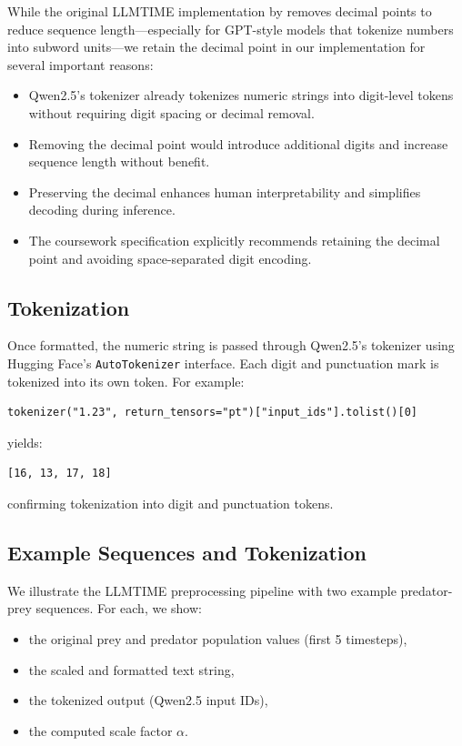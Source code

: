 \documentclass[a4paper,12pt]{article}
\begin{document}
While the original LLMTIME implementation by \citet{gruver2023language} removes decimal points to reduce sequence length—especially for GPT-style models that tokenize numbers into subword units—we retain the decimal point in our implementation for several important reasons:

\begin{itemize}
  \item Qwen2.5's tokenizer already tokenizes numeric strings into digit-level tokens without requiring digit spacing or decimal removal.
  \item Removing the decimal point would introduce additional digits and increase sequence length without benefit.
  \item Preserving the decimal enhances human interpretability and simplifies decoding during inference.
  \item The coursework specification explicitly recommends retaining the decimal point and avoiding space-separated digit encoding.
\end{itemize}

\subsection*{Tokenization}

Once formatted, the numeric string is passed through Qwen2.5’s tokenizer using Hugging Face’s \texttt{AutoTokenizer} interface. Each digit and punctuation mark is tokenized into its own token. For example:
\begin{verbatim}
tokenizer("1.23", return_tensors="pt")["input_ids"].tolist()[0]
\end{verbatim}
yields:
\begin{verbatim}
[16, 13, 17, 18]
\end{verbatim}
confirming tokenization into digit and punctuation tokens.

\subsection*{Example Sequences and Tokenization}

We illustrate the LLMTIME preprocessing pipeline with two example predator-prey sequences. For each, we show:

\begin{itemize}
  \item the original prey and predator population values (first 5 timesteps),
  \item the scaled and formatted text string,
  \item the tokenized output (Qwen2.5 input IDs),
  \item the computed scale factor $\alpha$.
\end{itemize}
\end{document}
